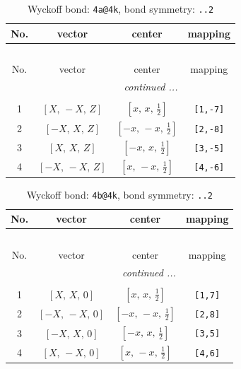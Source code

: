 \documentclass[fleqn,8pt]{jsarticle}
\begin{document}
\begin{longtable}{cccc}
\caption{Wyckoff bond: {\tt 4a@4k}, bond symmetry: {\tt ..2}}
 \\
 \hline \hline
No. & vector & center & mapping \\ \hline \endfirsthead

\multicolumn{3}{l}{\tablename\ \thetable{}} \\
 \hline \hline
No. & vector & center & mapping \\ \hline \endhead

 \hline \hline
\multicolumn{3}{r}{\footnotesize\it continued ...} \\ \endfoot

 \hline \hline
\multicolumn{3}{r}{} \\ \endlastfoot

1 & $\left[ X,\, - X,\, Z \right]$ & $\left[ x,\, x,\, \frac{1}{2} \right]$ & {\tt [1,-7]} \\ \hline
2 & $\left[ - X,\, X,\, Z \right]$ & $\left[ - x,\, - x,\, \frac{1}{2} \right]$ & {\tt [2,-8]} \\ \hline
3 & $\left[ X,\, X,\, Z \right]$ & $\left[ - x,\, x,\, \frac{1}{2} \right]$ & {\tt [3,-5]} \\ \hline
4 & $\left[ - X,\, - X,\, Z \right]$ & $\left[ x,\, - x,\, \frac{1}{2} \right]$ & {\tt [4,-6]} \\
\end{longtable}
\renewcommand{\arraystretch}{1.2}
\begin{longtable}{cccc}
\caption{Wyckoff bond: {\tt 4b@4k}, bond symmetry: {\tt ..2}}
 \\
 \hline \hline
No. & vector & center & mapping \\ \hline \endfirsthead

\multicolumn{3}{l}{\tablename\ \thetable{}} \\
 \hline \hline
No. & vector & center & mapping \\ \hline \endhead

 \hline \hline
\multicolumn{3}{r}{\footnotesize\it continued ...} \\ \endfoot

 \hline \hline
\multicolumn{3}{r}{} \\ \endlastfoot

1 & $\left[ X,\, X,\, 0 \right]$ & $\left[ x,\, x,\, \frac{1}{2} \right]$ & {\tt [1,7]} \\ \hline
2 & $\left[ - X,\, - X,\, 0 \right]$ & $\left[ - x,\, - x,\, \frac{1}{2} \right]$ & {\tt [2,8]} \\ \hline
3 & $\left[ - X,\, X,\, 0 \right]$ & $\left[ - x,\, x,\, \frac{1}{2} \right]$ & {\tt [3,5]} \\ \hline
4 & $\left[ X,\, - X,\, 0 \right]$ & $\left[ x,\, - x,\, \frac{1}{2} \right]$ & {\tt [4,6]} \\
\end{longtable}
\end{document}
